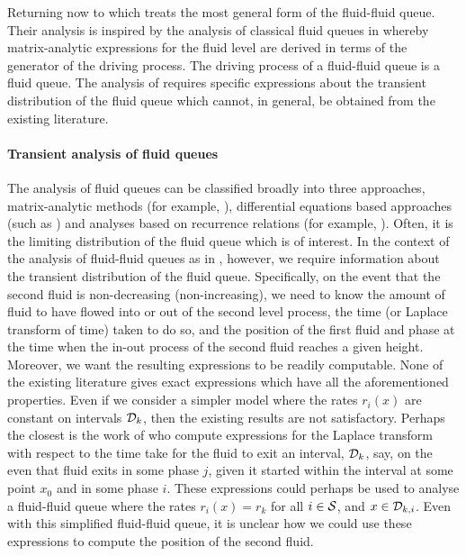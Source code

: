 Returning now to \cite{bo2014} which treats the most general form of the fluid-fluid queue. Their analysis is inspired by the analysis of classical fluid queues in \cite{bean2005} whereby matrix-analytic expressions for the fluid level are derived in terms of the generator of the driving process. The driving process of a fluid-fluid queue is a fluid queue. The analysis of \cite{bo2014} requires specific expressions about the transient distribution of the fluid queue which cannot, in general, be obtained from the existing literature.

\paragraph{Transient analysis of fluid queues} The analysis of fluid queues can be classified broadly into three approaches, matrix-analytic methods (for example, \cite{ajr2005,ar2003,ar2004,bean2005b,bean2005,bot08,bean2009,dasilva2005,latouche2018}), differential equations based approaches (such as \cite{anick1982,kk1995,blnos2022}) and analyses based on recurrence relations (for example, \cite{sericola1998,sericola1999,sericola2001}). Often, it is the limiting distribution of the fluid queue which is of interest. In the context of the analysis of fluid-fluid queues as in \cite{bo2014}, however, we require information about the transient distribution of the fluid queue. Specifically, on the event that the second fluid is non-decreasing (non-increasing), we need to know the amount of fluid to have flowed into or out of the second level process, the time (or Laplace transform of time) taken to do so, and the position of the first fluid and phase at the time when the in-out process of the second fluid reaches a given height. Moreover, we want the resulting expressions to be readily computable. None of the existing literature gives exact expressions which have all the aforementioned properties. Even if we consider a simpler model where the rates \(r_i(x)\) are constant on intervals \(\mathcal{D}_{k}\), then the existing results are not satisfactory. Perhaps the closest is the work of \cite{bean2009} who compute expressions for the Laplace transform with respect to the time take for the fluid to exit an interval, \(\mathcal{D}_{k}\), say, on the even that fluid exits in some phase \(j\), given it started within the interval at some point \(x_0\) and in some phase \(i\). These expressions could perhaps be used to analyse a fluid-fluid queue where the rates \(r_i(x)=r_k\) for all \(i\in\mathcal{S}\), and \(x\in\mathcal{D}_{k,i}\). Even with this simplified fluid-fluid queue, it is unclear how we could use these expressions to compute the position of the second fluid. 

